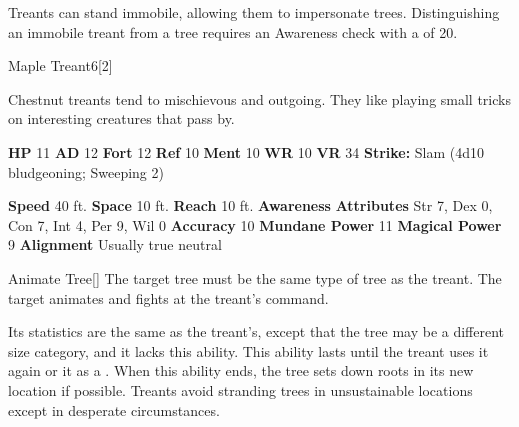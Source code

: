         Treants can stand immobile, allowing them to impersonate trees.
        Distinguishing an immobile treant from a tree requires an Awareness check with a  of 20.
  

  \begin{monsubsection}{Maple Treant}{6}[2]
    \vspace{-1em}\vspace{-1em}
    \vspace{0em}

    
          Chestnut treants tend to mischievous and outgoing.
          They like playing small tricks on interesting creatures that pass by.
        

    \begin{spellcontent}
      \begin{spelltargetinginfo}
        \pari \textbf{HP} 11 \monsep
          \textbf{AD} 12 \monsep
          \textbf{Fort} 12 \monsep
          \textbf{Ref} 10 \monsep
          \textbf{Ment} 10
        \pari \textbf{WR} 10 \monsep
        \textbf{VR} 34
        \pari \textbf{Strike:}
            Slam  (4d10 bludgeoning; Sweeping 2)
      \end{spelltargetinginfo}
    \end{spellcontent}
    \begin{monsterfooter}
      \pari \textbf{Speed} 40 ft. \monsep
        \textbf{Space} 10 ft. \monsep
        \textbf{Reach} 10 ft.
      \pari \textbf{Awareness} 
      \pari \textbf{Attributes}
        Str 7, Dex 0,
        Con 7, Int 4,
        Per 9, Wil 0
      \pari \textbf{Accuracy} 10 \monsep
        \textbf{Mundane Power} 11 \monsep
      \textbf{Magical Power} 9
      \pari \textbf{Alignment} Usually true neutral
    \end{monsterfooter}
  \end{monsubsection}
  \begin{freeability}{Animate Tree}[]
      The target tree must be the same type of tree as the treant.
        The target animates and fights at the treant's command.

        Its statistics are the same as the treant's, except that the tree may be a different size category, and it lacks this ability.
        This ability lasts until the treant uses it again or  it as a .
        When this ability ends, the tree sets down roots in its new location if possible.
        Treants avoid stranding trees in unsustainable locations except in desperate circumstances.
    \end{freeability}
  
